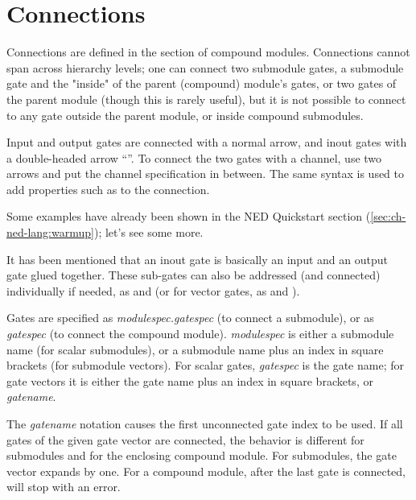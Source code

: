 \section{Connections}
\label{sec:ch-ned-lang:connections}

Connections are defined in the  section of compound
modules. Connections cannot span across hierarchy levels; one can connect
two submodule gates, a submodule gate and the "inside" of the parent
(compound) module's gates, or two gates of the parent module (though this
is rarely useful), but it is not possible to connect to any gate outside the
parent module, or inside compound submodules.

Input and output gates are connected with a normal arrow, and inout gates
with a double-headed arrow ``\ttt{<-{}->}''. To connect the two gates
with a channel, use two arrows and put the channel specification in between.
The same syntax is used to add properties such as  to the
connection.

Some examples have already been shown in the NED Quickstart section
(\ref{sec:ch-ned-lang:warmup}); let's see some more.



It has been mentioned that an inout gate is basically an input and an
output gate glued together. These sub-gates can also be addressed (and
connected) individually if needed, as  and  (or
for vector gates, as  and ).



Gates are specified as \textit{modulespec.gatespec} (to connect a submodule),
or as \textit{gatespec} (to connect the compound module). \textit{modulespec}
is either a submodule name (for scalar submodules), or a submodule name plus
an index in square brackets (for submodule vectors). For scalar gates,
\textit{gatespec} is the gate name; for gate vectors it is either the gate name
plus an index in square brackets, or \textit{gatename}\ttt{++}.

The \textit{gatename}\ttt{++} notation causes the first unconnected gate index
to be used. If all gates of the given gate vector are connected, the behavior
is different for submodules and for the enclosing compound module.
For submodules, the gate vector expands by one. For a compound module,
after the last gate is connected, \ttt{++} will stop with an error.

